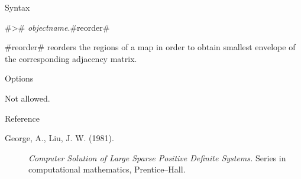 \begin{stanza}{Syntax}

{#># {\em objectname}.#reorder#

#reorder# reorders the regions of a map in order to obtain
smallest envelope of the corresponding adjacency matrix.}
\end{stanza}

\begin{stanza}{Options}

{Not allowed.}
\end{stanza}

\begin{stanza}{Reference}

{\begin{description}

\item[George, A., Liu, J. W. (1981).] {\em Computer Solution of Large
Sparse Positive Definite Systems.} Series in computational
mathematics, Prentice--Hall.

\end{description}}
\end{stanza}
